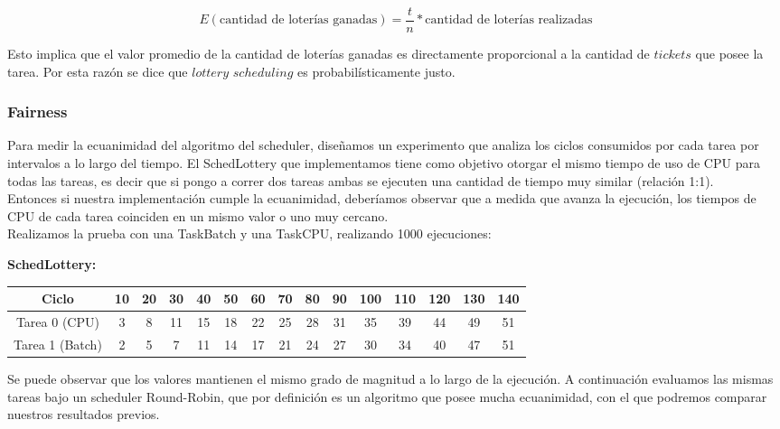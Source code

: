 \[
	E(\text{cantidad de loter\'ias ganadas}) = \frac{t}{n}*\text{cantidad de loter\'ias realizadas}
\]

Esto implica que el valor promedio de la cantidad de loter\'ias ganadas es directamente proporcional a la cantidad de $tickets$ que posee la tarea. Por esta raz\'on se dice que $lottery$ $scheduling$ es probabil\'isticamente justo.

\subsubsection{Fairness}

Para medir la ecuanimidad del algoritmo del scheduler, diseñamos un experimento que analiza los ciclos consumidos por cada tarea
por intervalos a lo largo del tiempo.
El SchedLottery que implementamos tiene como objetivo otorgar el mismo tiempo de uso de CPU para todas las tareas, es decir que si pongo a correr dos tareas ambas se 
ejecuten una cantidad de tiempo muy similar (relación 1:1).\\
Entonces si nuestra implementación cumple la ecuanimidad, deberíamos observar que a medida que avanza la ejecución, los tiempos de CPU de cada tarea coinciden en un mismo valor o
uno muy cercano.\\

Realizamos la prueba con una TaskBatch y una TaskCPU, realizando 1000 ejecuciones:\\

\begin{flushleft}
\textbf{SchedLottery:}\end{flushleft}
\begin{center}
\begin{tabular}{|c|c|c|c|c|c|c|c|c|c|c|c|c|c|c|}
\hline
Ciclo & 10 & 20 & 30 & 40 & 50 & 60 & 70 & 80 & 90 & 100 & 110 & 120 & 130 & 140 \\ 
\hline
\hline
Tarea 0 (CPU) & 3 & 8 & 11 & 15 & 18 & 22 & 25 & 28 & 31 & 35 & 39 & 44 & 49 & 51 \\
\hline
Tarea 1 (Batch) & 2 & 5 & 7 & 11 & 14 & 17 & 21 & 24 & 27 & 30 & 34 & 40 & 47 & 51 \\ 
\hline
\end{tabular}\end{center}

Se puede observar que los valores mantienen el mismo grado de magnitud a lo largo de la ejecución.
A continuación evaluamos las mismas tareas bajo un scheduler Round-Robin, que por definición es un algoritmo
que posee mucha ecuanimidad, con el que podremos comparar nuestros resultados previos.\\

